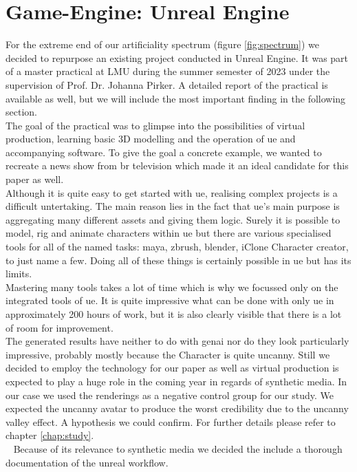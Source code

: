 \documentclass[
  a4paper,  %
  twoside,  %
  bibliography=totoc,
  headsepline,
  cleardoublepage=empty,
  parskip=half,
  draft=false
]{scrbook}
\begin{document}
\section{Game-Engine: Unreal Engine}
For the extreme end of our artificiality spectrum (figure \ref{fig:spectrum}) we decided to repurpose an existing project conducted in Unreal Engine. It was part of a master practical at LMU during the summer semester of 2023 under the supervision of Prof. Dr. Johanna Pirker. A detailed report of the practical is available as well, but we will include the most important finding in the following section. \\
The goal of the practical was to glimpse into the possibilities of virtual production, learning basic 3D modelling and the operation of \gls{ue} and accompanying software. To give the goal a concrete example, we wanted to recreate a news show from \gls{br} television which made it an ideal candidate for this paper as well. \\
Although it is quite easy to get started with \gls{ue}, realising complex projects is a difficult untertaking. The main reason lies in the fact that \gls{ue}'s main purpose is aggregating many different assets and giving them logic. Surely it is possible to model, rig and animate characters within \gls{ue} but there are various specialised tools for all of the named tasks: maya, zbrush, blender, iClone Character creator, to just name a few. Doing all of these things is certainly possible in \gls{ue} but has its limits. \\
Mastering many tools takes a lot of time which is why we focussed only on the integrated tools of \gls{ue}. It is quite impressive what can be done with only \gls{ue} in approximately 200 hours of work, but it is also clearly visible that there is a lot of room for improvement. \\
The generated results have neither to do with \gls{genai} nor do they look particularly impressive, probably mostly because the Character is quite uncanny. Still we decided to employ the technology for our paper as well as virtual production is expected to play a huge role in the coming year in regards of synthetic media. In our case we used the renderings as a negative control group for our study. We expected the uncanny avatar to produce the worst credibility due to the uncanny valley effect. A hypothesis we could confirm. For further details please refer to chapter \ref{chap:study}. \\ 
Because of its relevance to synthetic media we decided the include a thorough documentation of the unreal workflow.
\end{document}
